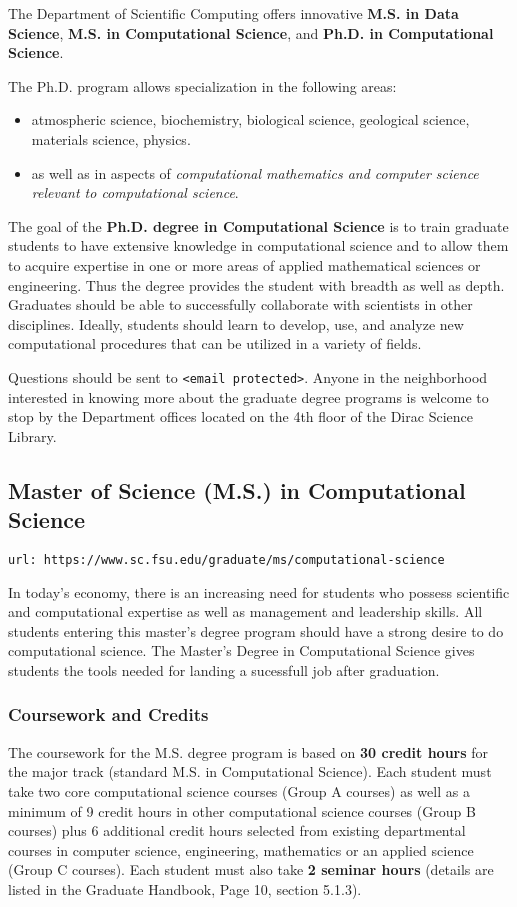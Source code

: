 \documentclass[12pt,a4paper]{article}
\begin{document}
The Department of Scientific Computing offers innovative \textbf{M.S. in Data Science}, \textbf{M.S. in Computational Science}, and \textbf{Ph.D. in Computational Science}.

The Ph.D. program allows specialization in the following areas:
\begin{itemize}
    \item atmospheric science, biochemistry, biological science, geological science, materials science, physics.
    \item as well as in aspects of \textit{computational mathematics and computer science relevant to computational science}.
\end{itemize}

The goal of the \textbf{Ph.D. degree in Computational Science} is to train graduate students to have extensive knowledge in computational science and to allow them to acquire expertise in one or more areas of applied mathematical sciences or engineering. Thus the degree provides the student with breadth as well as depth. Graduates should be able to successfully collaborate with scientists in other disciplines. Ideally, students should learn to develop, use, and analyze new computational procedures that can be utilized in a variety of fields.

Questions should be sent to \texttt{<email protected>}. Anyone in the neighborhood interested in knowing more about the graduate degree programs is welcome to stop by the Department offices located on the 4th floor of the Dirac Science Library.

\subsection{Master of Science (M.S.) in Computational Science}
\texttt{url: https://www.sc.fsu.edu/graduate/ms/computational-science}

In today's economy, there is an increasing need for students who possess scientific and computational expertise as well as management and leadership skills. All students entering this master's degree program should have a strong desire to do computational science. The Master's Degree in Computational Science gives students the tools needed for landing a sucessfull job after graduation.

\subsubsection*{Coursework and Credits}
The coursework for the M.S. degree program is based on \textbf{30 credit hours} for the major track (standard M.S. in Computational Science). Each student must take two core computational science courses (Group A courses) as well as a minimum of 9 credit hours in other computational science courses (Group B courses) plus 6 additional credit hours selected from existing departmental courses in computer science, engineering, mathematics or an applied science (Group C courses). Each student must also take \textbf{2 seminar hours} (details are listed in the Graduate Handbook, Page 10, section 5.1.3).
\end{document}
